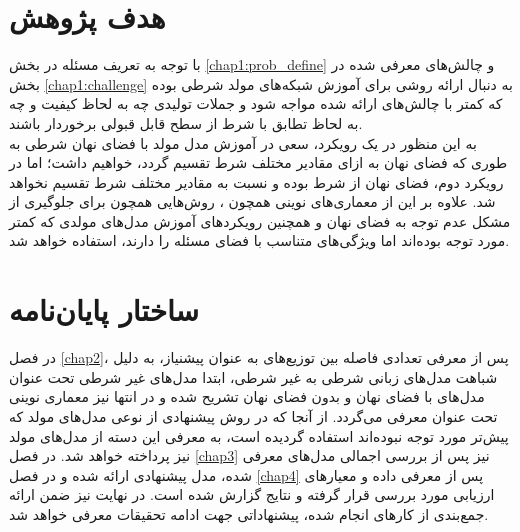 \section{هدف پژوهش}
با توجه به تعریف مسئله در بخش \ref{chap1:prob_define} و چالش‌های معرفی شده در بخش \ref{chap1:challenge} به دنبال ارائه روشی برای آموزش شبکه‌های مولد شرطی بوده که کمتر با چالش‌های ارائه شده مواجه شود و جملات تولیدی چه به لحاظ کیفیت و چه به لحاظ تطابق با شرط از سطح قابل قبولی برخوردار باشند.
\\
به این منظور در یک رویکرد، سعی در آموزش مدل مولد با فضای نهان شرطی به طوری که فضای نهان به ازای مقادیر مختلف شرط تقسیم گردد، خواهیم داشت؛ اما در رویکرد دوم، فضای نهان از شرط 
بوده و نسبت به مقادیر مختلف شرط تقسیم نخواهد شد. علاوه بر این از معماری‌های نوینی همچون \transformer{}، روش‌هایی همچون \wae{} برای جلوگیری از مشکل عدم توجه به فضای نهان و همچنین رویکرد‌های آموزش مدل‌های مولدی که کمتر مورد توجه بوده‌اند اما ویژگی‌های متناسب با فضای مسئله را دارند، استفاده خواهد شد.

\section{ساختار پایان‌نامه}
در فصل \ref{chap2}، پس از معرفی تعدادی فاصله بین توزیع‌های به عنوان پیشنیاز، به دلیل شباهت مدل‌های زبانی شرطی به غیر شرطی، ابتدا مدل‌های غیر شرطی تحت عنوان مدل‌های با فضای نهان و بدون فضای نهان تشریح شده و در انتها نیز معماری نوینی تحت عنوان \transformer{} معرفی می‌گردد. از آنجا که در روش پیشنهادی از نوعی مدل‌های مولد که پیش‌تر مورد توجه نبوده‌اند استفاده گردیده است، به معرفی این دسته از مدل‌های مولد نیز پرداخته خواهد شد. در فصل \ref{chap3} نیز پس از بررسی اجمالی مدل‌های معرفی شده، مدل پیشنهادی ارائه شده و در فصل  \ref{chap4} پس از معرفی داده و معیارهای ارزیابی مورد بررسی قرار گرفته و نتایج گزارش شده است. در نهایت نیز ضمن ارائه جمع‌بندی از کارهای انجام شده، پیشنهاداتی جهت ادامه تحقیقات معرفی خواهد شد.




